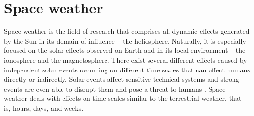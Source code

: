

% 
% 





\section{Space weather}
\label{sec:space_weather}
Space weather is the field of research that comprises all dynamic effects generated by the Sun in its domain of influence -- the heliosphere. Naturally, it is especially focused on the solar effects observed on Earth and in its local environment -- the ionosphere and the magnetosphere. There exist several different effects caused by independent solar events occurring on different time scales that can affect humans directly or indirectly. Solar events affect sensitive technical systems and strong events are even able to disrupt them and pose a threat to humans \citep{Bothmer2007}. Space weather deals with effects on time scales similar to the terrestrial weather, that is, hours, days, and weeks.

